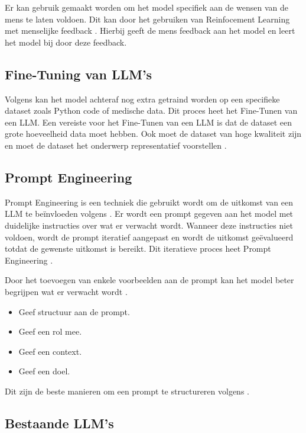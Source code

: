 Er kan gebruik gemaakt worden om het model specifiek aan de wensen van de mens te laten voldoen. Dit kan door het gebruiken van Reinfocement Learning met menselijke feedback \autocite{LambertEtAL2022}. 
Hierbij geeft de mens feedback aan het model en leert het model bij door deze feedback.

\subsection{Fine-Tuning van LLM's}
\label{sec:fine-tuning-van-llms}

Volgens \textcite{Peckham2024} kan het model achteraf nog extra getraind worden op een specifieke dataset zoals Python code of medische data.
Dit proces heet het Fine-Tunen van een LLM.
Een vereiste voor het Fine-Tunen van een LLM is dat de dataset een grote hoeveelheid data moet hebben.
Ook moet de dataset van hoge kwaliteit zijn en moet de dataset het onderwerp representatief voorstellen \autocite{Peckham2024}.

\subsection{Prompt Engineering}
\label{sec:prompt-engineering}

Prompt Engineering is een techniek die gebruikt wordt om de uitkomst van een LLM te beïnvloeden volgens \textcite{Google2023}.
Er wordt een prompt gegeven aan het model met duidelijke instructies over wat er verwacht wordt. 
Wanneer deze instructies niet voldoen, wordt de prompt iteratief aangepast en wordt de uitkomst geëvalueerd totdat de gewenste uitkomst is bereikt.
Dit iteratieve proces heet Prompt Engineering \autocite{Trad2024}.

Door het toevoegen van enkele voorbeelden aan de prompt kan het model beter begrijpen wat er verwacht wordt \autocite{OpenAi2024a}.
\begin{itemize}
  \item Geef structuur aan de prompt.
  \item Geef een rol mee.
  \item Geef een context.
  \item Geef een doel.
\end{itemize} 
Dit zijn de beste manieren om een prompt te structureren volgens \autocite{Google2023}.

\subsection{Bestaande LLM's}
\label{sec:bestaande-llms}

